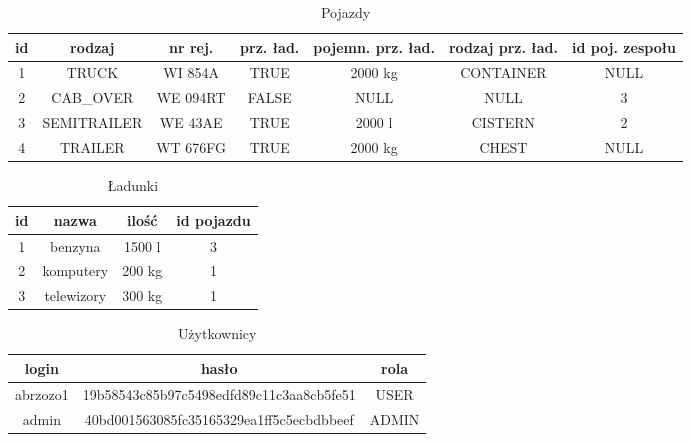 \begin{table}[h]
    \centering
    \begin{tabular}{ |c|c|c|c|c|c|c| }
        \hline
        id & rodzaj & nr rej. & prz. ład. & pojemn. prz. ład. & rodzaj prz. ład. & id poj. zespołu \\ \hline
        1 & TRUCK & WI 854A & TRUE & 2000 \si{\kilogram} & CONTAINER & NULL \\ \hline
        2 & CAB{\_}OVER & WE 094RT & FALSE & NULL & NULL & 3 \\ \hline
        3 & SEMITRAILER& WE 43AE & TRUE & 2000 \si{\litre} & CISTERN & 2 \\ \hline
        4 & TRAILER & WT 676FG & TRUE & 2000 \si{\kilogram} & CHEST & NULL \\ \hline
    \end{tabular}
    \caption {Pojazdy}
\end{table}

\begin{table}[h]
    \centering
    \begin{tabular}{ |c|c|c|c| }
        \hline
        id & nazwa & ilość & id pojazdu \\ \hline
        1 & benzyna & 1500 \si{\litre} & 3 \\ \hline
        2 & komputery & 200 \si{\kilogram} & 1 \\ \hline
        3 & telewizory & 300 \si{\kilogram} & 1 \\ \hline
    \end{tabular}
    \caption {Ładunki}
\end{table}

\begin{table}[h]
    \centering
    \begin{tabular}{ |c|c|c| }
        \hline
        login & hasło & rola \\ \hline
        abrzozo1 & 19b58543c85b97c5498edfd89c11c3aa8cb5fe51 & USER \\ \hline
        admin & 40bd001563085fc35165329ea1ff5c5ecbdbbeef & ADMIN \\ \hline
    \end{tabular}
    \caption {Użytkownicy}
\end{table}
